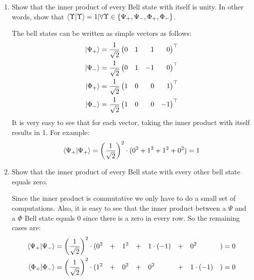 \documentclass[12pt]{article}
\newcommand{\pmat}[1]{\begin{pmatrix}#1\end{pmatrix}}
\newcommand{\rsqrt}[1]{\ensuremath{\frac{1}{\sqrt{#1}}}}
\newenvironment{answer}{\begingroup\setlength{\leftskip}{-\leftmargin}\begin{framed}}{\end{framed}\endgroup}
\begin{document}
\begin{enumerate}

    \item Show that the inner product of every Bell state with itself is unity. In other words, show that $\braket{\Upsilon|\Upsilon} = 1 | \forall \Upsilon \in \{\Psi_+, \Psi_-, \Phi_+, \Phi_-\}$.

    \begin{answer}
        The bell states can be written as simple vectors as follows:
        \begin{align*}{2}
            \ket{\Psi_+} &= \rsqrt{2} \pmat{0 & 1 & \phantom{-}1 & \phantom{-}0}^\top \\
            \ket{\Psi_-} &= \rsqrt{2} \pmat{0 & 1 &           -1 & \phantom{-}0}^\top \\
            \ket{\Phi_+} &= \rsqrt{2} \pmat{1 & 0 & \phantom{-}0 & \phantom{-}1}^\top \\
            \ket{\Phi_-} &= \rsqrt{2} \pmat{1 & 0 & \phantom{-}0 &           -1}^\top \\
        \end{align*}
        It is very easy to see that for each vector, taking the inner product with itself results in 1. For example:
        \begin{align*}
            \braket{\Psi_+|\Psi_+} = \left(\rsqrt{2}\right)^2 \cdot (0^2 + 1^2 + 1^2 + 0^2) = 1
        \end{align*}
    \end{answer}

    \item Show that the inner product of every Bell state with every other bell state equals zero.

    \begin{answer}
        Since the inner product is commutative we only have to do a small set of computations. Also, it is easy to see that the inner product between a $\Psi$ and a $\Phi$ Bell state equals $0$ since there is a zero in every row. So the remaining cases are:
        \begin{alignat*}{8}
            \braket{\Psi_+|\Psi_-} &= \left(\rsqrt{2}\right)^2 \cdot (0^2 && + && 1^2 && + && 1\cdot(-1) && + && 0^2    && ) = 0 \\
            \braket{\Phi_+|\Phi_-} &= \left(\rsqrt{2}\right)^2 \cdot (1^2 && + && 0^2 && + && 0^2    && + && 1\cdot(-1) && ) = 0 \\
        \end{alignat*}
    \end{answer}


\end{enumerate}
\end{document}
